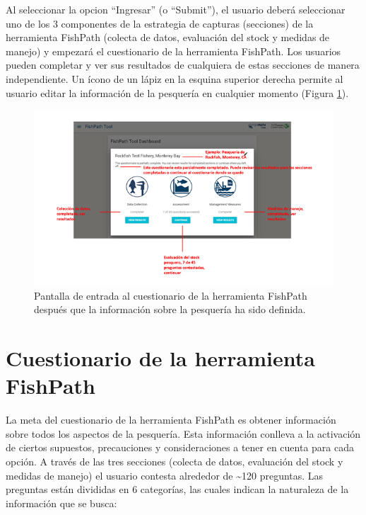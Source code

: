 \documentclass[
  11pt,
]{book}
\begin{document}
Al seleccionar la opcion ``Ingresar'' (o ``Submit''), el usuario deberá seleccionar uno de los 3 componentes de la estrategia de capturas (secciones) de la herramienta FishPath (colecta de datos, evaluación del stock y medidas de manejo) y empezará el cuestionario de la herramienta FishPath. Los usuarios pueden completar y ver sus resultados de cualquiera de estas secciones de manera independiente. Un ícono de un lápiz en la esquina superior derecha permite al usuario editar la información de la pesquería en cualquier momento (Figura \ref{fig:fishery-entry}).

\begin{figure}

{\centering \includegraphics[width=0.95\linewidth]{images/fishery-entry-screen-es} 

}

\caption{Pantalla de entrada al cuestionario de la herramienta FishPath después que la información sobre la pesquería ha sido definida.}\label{fig:fishery-entry}
\end{figure}

\hypertarget{cuestionario-de-la-herramienta-fishpath}{%
\chapter{Cuestionario de la herramienta FishPath}\label{cuestionario-de-la-herramienta-fishpath}}

La meta del cuestionario de la herramienta FishPath es obtener información sobre todos los aspectos de la pesquería. Esta información conlleva a la activación de ciertos supuestos, precauciones y consideraciones a tener en cuenta para cada opción. A través de las tres secciones (colecta de datos, evaluación del stock y medidas de manejo) el usuario contesta alrededor de \textasciitilde120 preguntas. Las preguntas están divididas en 6 categorías, las cuales indican la naturaleza de la información que se busca:
\end{document}
